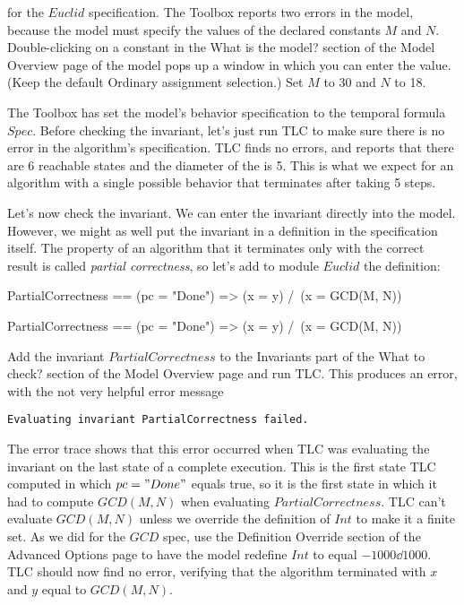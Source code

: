  for the $Euclid$
specification.  The Toolbox reports two errors in the model, because 
the model must specify the values of the declared constants $M$ and $N$.
Double-clicking on a constant in the \textsf{What is the model?} section
of the \textsf{Model Overview} page of the model pops up a window in
which you can enter the value.  (Keep the default \textsf{Ordinary assignment}
selection.)  Set $M$ to 30 and $N$ to 18.

The Toolbox has set the model's behavior specification to the temporal
formula $Spec$.  Before checking the invariant, let's just run TLC to
make sure there is no error in the algorithm's specification.  TLC
finds no errors, and reports that there are 6 reachable states and the
diameter of the  is 5.  This is what
we expect for an algorithm with a single possible behavior that
terminates after taking 5 steps.

Let's now check the invariant.  We can enter the invariant directly into
the model.  However, we might as well put the invariant in a definition
in the specification itself.  The property of an algorithm that it
terminates only with the correct result is called 
\emph{partial correctness}, so let's add to module $Euclid$ the definition:
\begin{twocols}[.485]
\begin{notla}
PartialCorrectness ==
  (pc = "Done") => (x = y) /\ (x = GCD(M, N))
\end{notla}
\begin{tlatex}
%
\end{tlatex}
\midcol
\begin{verbatim*}
PartialCorrectness ==
  (pc = "Done") => (x = y) /\ (x = GCD(M, N))
\end{verbatim*}
\end{twocols}
Add the invariant $PartialCorrectness$ to the \textsf{Invariants} part
of the \textsf{What to check?} section of the \textsf{Model Overview}
page and run TLC\@.  This produces an error, with the not very helpful
error message
\begin{display}
\texttt{Evaluating invariant PartialCorrectness failed.}
\end{display}
The error trace shows that this error occurred when TLC was evaluating
the invariant on the last state of a complete execution.  This
is the first state TLC computed in which $pc="Done"$ equals true,
so it is the first state in which it had to compute $GCD(M,N)$ when
evaluating $PartialCorrectness$.  TLC can't evaluate $GCD(M,N)$ unless
we override the definition of $Int$ to make it a finite set.  As we did
for the $GCD$ spec, use the \textsf{Definition Override} section of
the \textsf{Advanced Options} page to have the model redefine $Int$
to equal $-1000\dd 1000$.  TLC should now find no error, verifying that
the algorithm terminated with $x$ and $y$ equal to $GCD(M,N)$.

